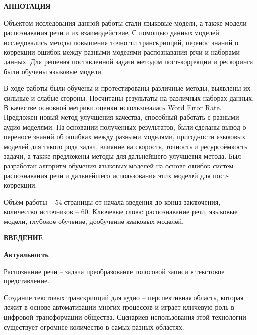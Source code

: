 \newpage
\begin{center}
  \textbf{\large АННОТАЦИЯ}
\end{center}


Объектом исследования данной работы стали языковые модели, а также модели распознавания речи и их взаимодействие.
С помощью данных моделей исследовались методы повышения точности транскрипций, перенос знаний о коррекции ошибок между разными моделями распознавания речи и наборами данных.
Для решения поставленной задачи методом пост-коррекции и рескоринга были обучены языковые модели.

В ходе работы были обучены и протестированы различные методы, выявлены их сильные и слабые стороны.
Посчитаны результаты на различных наборах данных.
В качестве основной метрики оценки использовалась Word Error Rate.
Предложен новый метод улучшения качества, способный работать с разными аудио моделями.
На основании полученных результатов, были сделаны вывод о переносе знаний об ошибках между разными моделями, пригодности языковых моделей для такого рода задач, влияние на скорость, точность и ресурсоёмкость задачи, а также предложены методы для дальнейшего улучшения метода.
Был разработан алгоритм обучения языковых моделей на основе ошибок систем распознавания речи и дальнейшего использования этих моделей для пост-коррекции.

Объём работы -- 54 страницы от начала введения до конца заключения, количество источников -- 60.
Ключевые слова: распознавание речи, языковые модели, глубокое обучение, дообучение языковых моделей.
\onehalfspacing

\newpage
\renewcommand{\contentsname}{\centerline{\large СОДЕРЖАНИЕ}}
\tableofcontents

\newpage
\begin{center}
  \textbf{\large ВВЕДЕНИЕ}
\end{center}


\textbf{Актуальность}

Распознание речи -- задача преобразование голосовой записи в текстовое представление.

Создание текстовых транскрипций для аудио  -- перспективная область, которая лежит в основе автоматизации многих процессов и играет ключевую роль в цифровой трансформации общества.
Сценариев использования этой технологии существует огромное количество в самых разных областях.

